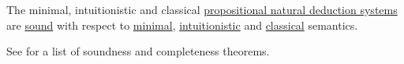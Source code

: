 \begin{theorem}\label{thm:propositional_natural_deduction_soundness}
  The minimal, intuitionistic and classical \hyperref[def:propositional_natural_deduction_systems]{propositional natural deduction systems} are \hyperref[def:logical_framework/soundness]{sound} with respect to \hyperref[def:minimal_propositional_semantics]{minimal}, \hyperref[def:propositional_semantics/intuitionistic]{intuitionistic} and \hyperref[def:propositional_semantics/classical]{classical} semantics.
\end{theorem}
\begin{comments}
  \item See  for a list of soundness and completeness theorems.
\end{comments}
